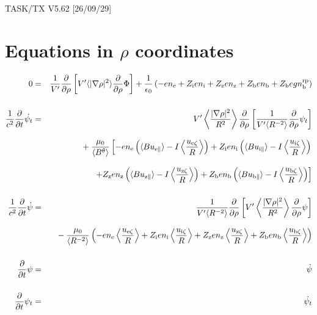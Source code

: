 \documentclass[11pt]{article}
\def\r#1{{\rm#1}}
\def\ave#1{\left\langle#1\right\rangle}
\def\aves#1{\langle#1\rangle}
\def\para{\parallel}
\def\ddrho{\frac{\partial}{\partial\rho}}
\def\ddt{\frac{\partial}{\partial t}}
\def\gradrho2{\aves{|\nabla\rho|^2}}
\def\psid{\dot{\psi}}
\def\psit{\psi_t}
\def\psitd{\dot{\psit}}
\def\nee{n_\r{e}}
\def\ni{n_\r{i}}
\def\nz{n_\r{z}}
\def\nb{n_\r{b}}
\def\Zi{Z_\r{i}}
\def\Zz{Z_\r{z}}
\def\Zb{Z_\r{b}}
\def\uzt#1{u_{\r{#1}\zeta}}
\def\upara#1{u_{\r{#1}\para}}
\def\nbrp{n_\r{b}^\r{rp}}
\begin{document}
\begin{center}
TASK/TX V5.62 [26/09/29]
\end{center}

\section{Equations in $\rho$ coordinates}
\vspace{-5mm}

%
\begin{eqnarray}
  0 &=&
%
    \frac{1}{V'} \ddrho \left[ V' \gradrho2 \ddrho{\Phi} \right]
%
  + \frac{1}{\epsilon_0}
%
    \left(-e \nee + \Zi e \ni + \Zz e \nz + \Zb e \nb + \Zb e g \nbrp \right)
\\[5mm]
  \frac{1}{c^2} \ddt \psitd &=&
%
    V' \ave{\frac{|\nabla\rho|^2}{R^2}} \ddrho \left[ \frac{1}{V'\aves{R^{-2}}}
				         \ddrho \psit \right] \nonumber\\[3mm]&&{}
%
  + \frac{\mu_0}{\aves{B^\theta}}
%
    \left[-     e \nee \left( \aves{B\upara{e}} - I\ave{\frac{\uzt{e}}{R}} \right)
          + \Zi e \ni  \left( \aves{B\upara{i}} - I\ave{\frac{\uzt{i}}{R}} \right)
    \right.\nonumber\\[3mm]&&{}
    \left.+ \Zz e \nz  \left( \aves{B\upara{z}} - I\ave{\frac{\uzt{z}}{R}} \right)
          + \Zb e \nb  \left( \aves{B\upara{b}} - I\ave{\frac{\uzt{b}}{R}} \right) \right]
\\[5mm]
  \frac{1}{c^2} \ddt \psid &=&
%
  \frac{1}{V'\aves{R^{-2}}} \ddrho \left[ V'
				    \ave{\frac{|\nabla\rho|^2}{R^2}}
				    \ddrho \psi \right] \nonumber\\[3mm]&&{}
%
  - \frac{\mu_0}{\aves{R^{-2}}} \left(-e \nee \ave{\frac{\uzt{e}}{R}}
			         + \Zi e \ni  \ave{\frac{\uzt{i}}{R}}
			         + \Zz e \nz  \ave{\frac{\uzt{z}}{R}}
			         + \Zb e \nb  \ave{\frac{\uzt{b}}{R}} \right)
%
\\[5mm]
  \ddt \psi &=&
%
  \psid
\\[5mm]
  \ddt \psit &=&
%
  \psitd
\end{eqnarray}
%

\end{document}
